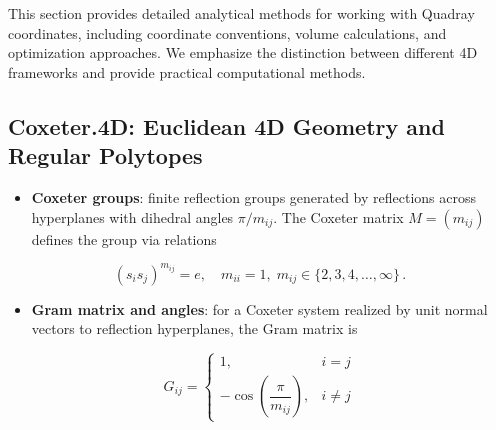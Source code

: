 \documentclass[
  10pt,
]{article}
\providecommand{\tightlist}{%
  \setlength{\itemsep}{0pt}\setlength{\parskip}{0pt}}
\begin{document}
This section provides detailed analytical methods for working with
Quadray coordinates, including coordinate conventions, volume
calculations, and optimization approaches. We emphasize the distinction
between different 4D frameworks and provide practical computational
methods.

\hypertarget{coxeter.4d-euclidean-4d-geometry-and-regular-polytopes}{%
\subsection{Coxeter.4D: Euclidean 4D Geometry and Regular
Polytopes}\label{coxeter.4d-euclidean-4d-geometry-and-regular-polytopes}}

\begin{itemize}
\tightlist
\item
  \textbf{Coxeter groups}: finite reflection groups generated by
  reflections across hyperplanes with dihedral angles \(\pi/m_{ij}\).
  The Coxeter matrix \(M = (m_{ij})\) defines the group via relations
\end{itemize}

\begin{equation}\label{eq:coxeter_relations}
(s_i s_j)^{m_{ij}} = e,\quad m_{ii}=1,\; m_{ij}\in\{2,3,4,\ldots,\infty\}\,.
\end{equation}

\begin{itemize}
\tightlist
\item
  \textbf{Gram matrix and angles}: for a Coxeter system realized by unit
  normal vectors to reflection hyperplanes, the Gram matrix is
\end{itemize}

\begin{equation}\label{eq:coxeter_gram}
G_{ij} = \begin{cases}
1, & i=j \\
-\cos\!\left(\dfrac{\pi}{m_{ij}}\right), & i\ne j
\end{cases}
\end{equation}
\end{document}

